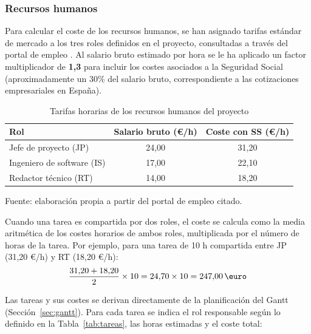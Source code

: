 \documentclass{article}
\begin{document}
    \subsubsection{Recursos humanos}
    \normalsize
    \setlength{\parskip}{0.6em}

    \justify
    Para calcular el coste de los recursos humanos, se han asignado tarifas estándar 
    de mercado a los tres roles definidos en el proyecto, consultadas a través del 
    portal de empleo \cite{noauthor_calcular_nodate}. Al salario bruto estimado por 
    hora se le ha aplicado un factor multiplicador de \textbf{1,3} para incluir los 
    costes asociados a la Seguridad Social (aproximadamente un 30\% del salario bruto, 
    correspondiente a las cotizaciones empresariales en España).

    \begin{table}[H]
    \centering
    \begin{tabular}{lcc}
    \hline
    \textbf{Rol} & \textbf{Salario bruto (\euro/h)} & \textbf{Coste con SS (\euro/h)} \\
    \hline
    Jefe de proyecto (JP) & 24,00 & 31,20 \\
    Ingeniero de software (IS) & 17,00 & 22,10 \\
    Redactor técnico (RT) & 14,00 & 18,20 \\
    \hline
    \end{tabular}
    \caption{Tarifas horarias de los recursos humanos del proyecto}
    \label{tab:costes_personal}
    \vspace{0.2cm}
    \footnotesize Fuente: elaboración propia a partir del portal de empleo citado.
    \end{table}

    \justify
    Cuando una tarea es compartida por dos roles, el coste se calcula como la media 
    aritmética de los costes horarios de ambos roles, multiplicada por el número de 
    horas de la tarea. Por ejemplo, para una tarea de 10 h compartida entre JP 
    (31,20 \euro/h) y RT (18,20 \euro/h):
    \[
    \frac{31{,}20 + 18{,}20}{2} \times 10 = 24{,}70 \times 10 = 247{,}00 \, \text{\euro}
    \]

    \justify
    Las tareas y sus costes se derivan directamente de la planificación del Gantt 
    (Sección~\ref{sec:gantt}). Para cada tarea se indica el rol responsable según 
    lo definido en la Tabla~\ref{tab:tareas}, las horas estimadas y el coste total:
\end{document}
